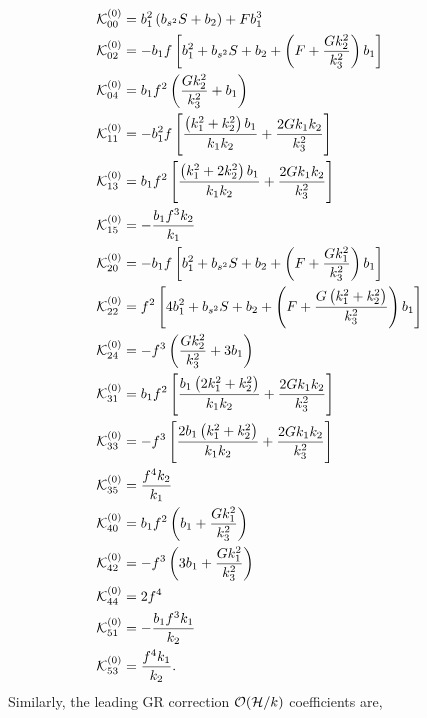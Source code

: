 \begin{align}
\mathcal{K}^{(0)}_{00}&= 
b_{1}^{2}\left(b_{s^2} S+b_{2}\right)+F b_{1}^{3}
 \\ \mathcal{K}^{(0)}_{02}&= - b_1f
 \left[b_{1}^{2}+b_{s^2} S +b_{2}+\left(F+\frac{G k_{2}^{2}}{k_{3}^{2}}\right) b_{1}\right]
 \\ \mathcal{K}^{(0)}_{04}&= 
b_1f^2 \left(\frac{G k_{2}^{2} }{k_{3}^{2}}+b_{1}\right)
 \\ \mathcal{K}^{(0)}_{11}&= 
-b_1^2f\left[\frac{\left(k_{1}^{2}+k_{2}^{2}\right) b_{1}}{k_{1} k_{2}}+\frac{2 G k_{1}  k_{2} }{k_{3}^{2}}\right] 
 \\ \mathcal{K}^{(0)}_{13}&= 
 b_1f^2\left[\frac{\left(k_{1}^{2}+2 k_{2}^{2}\right) b_{1}}{k_{1} k_{2}}+\frac{2 G k_{1}  k_{2} }{k_{3}^{2}}\right]
 \\ \mathcal{K}^{(0)}_{15}&= 
-\frac{b_{1}f^{3} k_{2} }{k_{1}}
 \\ \mathcal{K}^{(0)}_{20}&= 
- b_1 f \left[b_{1}^{2}+b_{s^2} S + b_{2}+\left(F+\frac{G k_{1}^{2}}{k_{3}^{2}}\right) b_{1}\right]
 \\ \mathcal{K}^{(0)}_{22}&= 
f^{2}\left[4 b_{1}^{2}+b_{s^2} S+b_{2}+\left(F+\frac{G\left(k_{1}^{2}+k_{2}^{2}\right)}{k_{3}^{2}}\right) b_{1}\right]
 \\ \mathcal{K}^{(0)}_{24}&= 
 -f^{3}\left(\frac{G k_{2}^{2}}{k_{3}^{2}}+3 b_{1}\right) 
 \\ \mathcal{K}^{(0)}_{31}&= 
b_1f^{2}\left[\frac{b_{1}\left(2 k_{1}^{2}+k_{2}^{2}\right) }{k_{1} k_{2}}+\frac{2 G k_{1}  k_{2} }{k_{3}^{2}}\right] 
 \\ \mathcal{K}^{(0)}_{33}&= 
 -f^{3}\left[\frac{2b_{1}\left(k_{1}^{2}+k_{2}^{2}\right) }{k_{1} k_{2}}+\frac{2 G k_{1}  k_{2}}{k_{3}^{2}}\right]
 \\ \mathcal{K}^{(0)}_{35}&= 
\frac{f^{4} k_{2}}{k_{1}}
 \\ \mathcal{K}^{(0)}_{40}&= 
b_{1}f^{2}\left(b_1+\frac{G k_{1}^{2} }{k_{3}^{2}}\right) 
 \\ \mathcal{K}^{(0)}_{42}&= 
 -f^3\left(3b_{{1}}+ {\frac {Gk_{{1}}^{2}}{k_{{3}}^{2}}}
 \right)
 \\ \mathcal{K}^{(0)}_{44}&= 
2 f^{4}
 \\ \mathcal{K}^{(0)}_{51}&= 
-\frac{ b_{1}f^{3} k_{1}}{k_{2}}
 \\ \mathcal{K}^{(0)}_{53}&= 
\frac{f^{4} k_{1}}{k_{2}}.
\end{align}
Similarly, the leading GR correction $\mathcal{O}(\mathcal{H}/k)$  coefficients are, 
